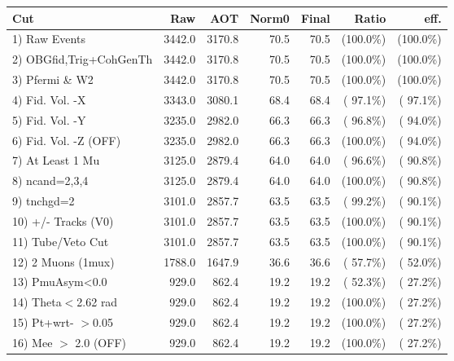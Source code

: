  \begin{table}[h!]\centering
 \begin{tabular}{||l||r|r|r|r|r|r||}
 \hline
 \hline
 Cut & Raw & AOT & Norm0 & Final & Ratio & eff.       \\
 \hline
  1) Raw Events           &       3442.0 &       3170.8 &         70.5 &         70.5 & (100.0\%) & (100.0\%) \\
  2) OBGfid,Trig+CohGenTh &       3442.0 &       3170.8 &         70.5 &         70.5 & (100.0\%) & (100.0\%) \\
  3) Pfermi \& W2         &       3442.0 &       3170.8 &         70.5 &         70.5 & (100.0\%) & (100.0\%) \\
  4) Fid. Vol. -X         &       3343.0 &       3080.1 &         68.4 &         68.4 & ( 97.1\%) & ( 97.1\%) \\
  5) Fid. Vol. -Y         &       3235.0 &       2982.0 &         66.3 &         66.3 & ( 96.8\%) & ( 94.0\%) \\
  6) Fid. Vol. -Z (OFF)   &       3235.0 &       2982.0 &         66.3 &         66.3 & (100.0\%) & ( 94.0\%) \\
  7) At Least 1 Mu        &       3125.0 &       2879.4 &         64.0 &         64.0 & ( 96.6\%) & ( 90.8\%) \\
  8) ncand=2,3,4          &       3125.0 &       2879.4 &         64.0 &         64.0 & (100.0\%) & ( 90.8\%) \\
  9) tnchgd=2             &       3101.0 &       2857.7 &         63.5 &         63.5 & ( 99.2\%) & ( 90.1\%) \\
 10) +/- Tracks (V0)      &       3101.0 &       2857.7 &         63.5 &         63.5 & (100.0\%) & ( 90.1\%) \\
 11) Tube/Veto Cut        &       3101.0 &       2857.7 &         63.5 &         63.5 & (100.0\%) & ( 90.1\%) \\
 12) 2 Muons (1mux)       &       1788.0 &       1647.9 &         36.6 &         36.6 & ( 57.7\%) & ( 52.0\%) \\
 13) PmuAsym<0.0          &        929.0 &        862.4 &         19.2 &         19.2 & ( 52.3\%) & ( 27.2\%) \\
 14) Theta$<$2.62 rad     &        929.0 &        862.4 &         19.2 &         19.2 & (100.0\%) & ( 27.2\%) \\
 15) Pt+wrt- $>$0.05      &        929.0 &        862.4 &         19.2 &         19.2 & (100.0\%) & ( 27.2\%) \\
 16) Mee $>$ 2.0  (OFF)   &        929.0 &        862.4 &         19.2 &         19.2 & (100.0\%) & ( 27.2\%) \\

\end{tabular}
\end{table}
